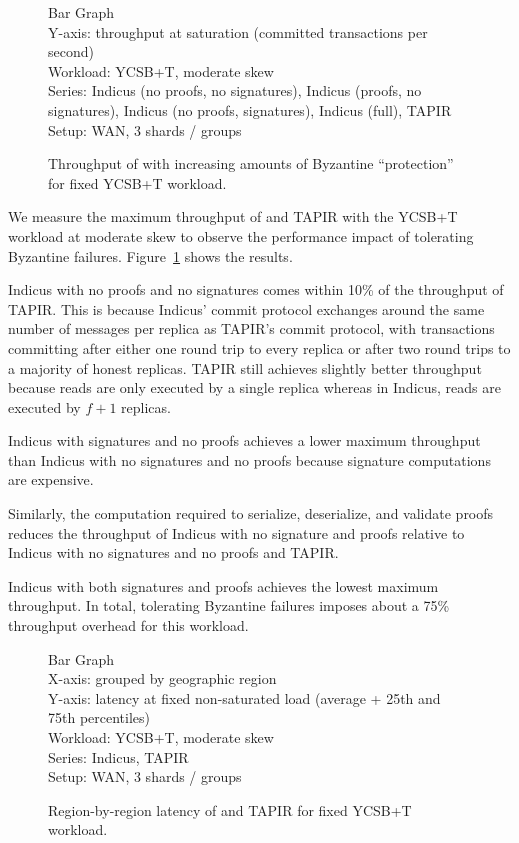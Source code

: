 \begin{figure}
  Bar Graph\\
  Y-axis: throughput at saturation (committed transactions per second)\\
  Workload: YCSB+T, moderate skew\\
  Series: Indicus (no proofs, no signatures), Indicus (proofs, no signatures),
    Indicus (no proofs, signatures), Indicus (full), TAPIR\\
  Setup: WAN, 3 shards / groups\\
  \caption{Throughput of \sys{} with increasing amounts of Byzantine
  ``protection'' for fixed YCSB+T workload.}
  \label{fig:bft-overhead-tput}
\end{figure}

We measure the maximum throughput of \sys{} and TAPIR with the YCSB+T workload at
moderate skew to observe the performance impact of tolerating Byzantine failures.
Figure~\ref{fig:bft-overhead-tput} shows the results.

Indicus with no proofs and no signatures comes within 10\% of the throughput of
TAPIR. This is because Indicus' commit protocol exchanges around the same
number of messages per replica as TAPIR's commit protocol, with
transactions committing after either one round trip to every replica or after
two round trips to a majority of honest replicas.  TAPIR still achieves slightly
better throughput because reads are only executed by a single replica whereas in
Indicus, reads are executed by $f+1$ replicas.

Indicus with signatures and no proofs achieves a lower maximum throughput than
Indicus with no signatures and no proofs because signature computations are
expensive.

Similarly, the computation required to serialize, deserialize, and validate
proofs reduces the throughput of Indicus with no signature and proofs relative
to Indicus with no signatures and no proofs and TAPIR.

Indicus with both signatures and proofs achieves the lowest maximum throughput.
In total, tolerating Byzantine failures imposes about a 75\% throughput overhead
for this workload.

\begin{figure}
  Bar Graph\\
  X-axis: grouped by geographic region\\
  Y-axis: latency at fixed non-saturated load (average + 25th and 75th percentiles)\\
  Workload: YCSB+T, moderate skew\\
  Series: Indicus, TAPIR\\
  Setup: WAN, 3 shards / groups\\
  \caption{Region-by-region latency of \sys{} and TAPIR for fixed YCSB+T workload.}
\end{figure}

